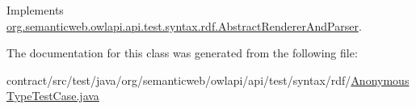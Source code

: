Implements \hyperlink{classorg_1_1semanticweb_1_1owlapi_1_1api_1_1test_1_1syntax_1_1rdf_1_1_abstract_renderer_and_parser_a6eb3d4cdc99bab1338cfad6899390e9f}{org.\-semanticweb.\-owlapi.\-api.\-test.\-syntax.\-rdf.\-Abstract\-Renderer\-And\-Parser}.



The documentation for this class was generated from the following file\-:\begin{DoxyCompactItemize}
\item 
contract/src/test/java/org/semanticweb/owlapi/api/test/syntax/rdf/\hyperlink{_anonymous_type_test_case_8java}{Anonymous\-Type\-Test\-Case.\-java}\end{DoxyCompactItemize}
